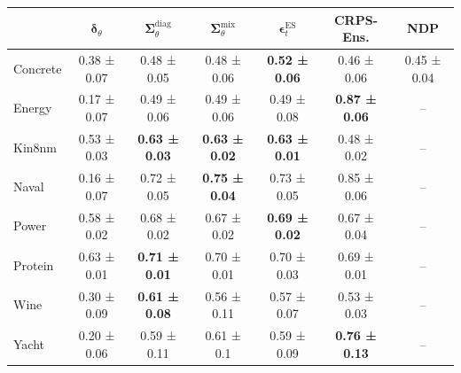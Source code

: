 \begin{tabular}{l|c|c|c|c|c|c}
\toprule
 & $\bm\delta_\theta$ & $\bm\Sigma_\theta^{\mathrm{diag}}$ & $\bm\Sigma_\theta^{\mathrm{mix}}$ & $\bm\epsilon_t^\mathrm{ES}$ & CRPS-Ens. & NDP \\
\midrule
Concrete & 0.38 ± 0.07 & 0.48 ± 0.05 & 0.48 ± 0.06 & \textbf{0.52 ± 0.06} & 0.46 ± 0.06 & 0.45 ± 0.04 \\
Energy & 0.17 ± 0.07 & 0.49 ± 0.06 & 0.49 ± 0.06 & 0.49 ± 0.08 & \textbf{0.87 ± 0.06} & -- \\
Kin8nm & 0.53 ± 0.03 & \textbf{0.63 ± 0.03} & \textbf{0.63 ± 0.02} & \textbf{0.63 ± 0.01} & 0.48 ± 0.02 & -- \\
Naval & 0.16 ± 0.07 & 0.72 ± 0.05 & \textbf{0.75 ± 0.04} & 0.73 ± 0.05 & 0.85 ± 0.06 & -- \\
Power & 0.58 ± 0.02 & 0.68 ± 0.02 & 0.67 ± 0.02 & \textbf{0.69 ± 0.02} & 0.67 ± 0.04 & -- \\
Protein & 0.63 ± 0.01 & \textbf{0.71 ± 0.01} & 0.70 ± 0.01 & 0.70 ± 0.03 & 0.69 ± 0.01 & -- \\
Wine & 0.30 ± 0.09 & \textbf{0.61 ± 0.08} & 0.56 ± 0.11 & 0.57 ± 0.07 & 0.53 ± 0.03 & -- \\
Yacht & 0.20 ± 0.06 & 0.59 ± 0.11 & 0.61 ± 0.1 & 0.59 ± 0.09 & \textbf{0.76 ± 0.13} & -- \\
\bottomrule
\end{tabular}
